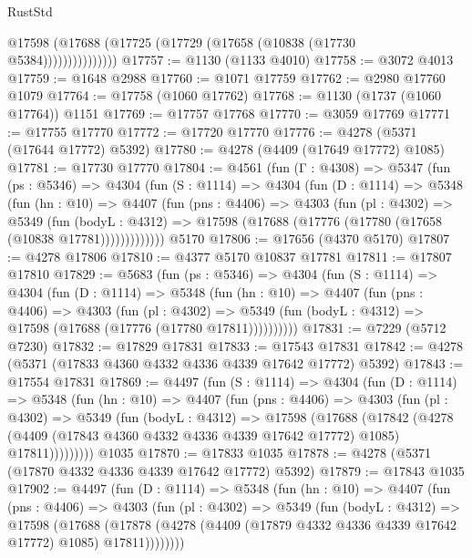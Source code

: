 \begin{lexlean}{RustStd}
\begin{coremodule}
                    @17598 (@17688 (@17725 (@17729 (@17658 (@10838 (@17730 @5384)))))))))))))))
@17757 := @1130 (@1133 @4010)
@17758 := @3072 @4013
@17759 := @1648 @2988
@17760 := @1071 @17759
@17762 := @2980 @17760 @1079
@17764 := @17758 (@1060 @17762)
@17768 := @1130 (@1737 (@1060 @17764)) @1151
@17769 := @17757 @17768
@17770 := @3059 @17769
@17771 := @17755 @17770
@17772 := @17720 @17770
@17776 := @4278 (@5371 (@17644 @17772) @5392)
@17780 := @4278 (@4409 (@17649 @17772) @1085)
@17781 := @17730 @17770
@17804 := @4561
    (fun (Γ : @4308) =>
    @5347
      (fun (ps : @5346) =>
      @4304
        (fun (S : @1114) =>
        @4304
          (fun (D : @1114) =>
          @5348
            (fun (hn : @10) =>
            @4407
              (fun (pns : @4406) =>
              @4303
                (fun (pl : @4302) =>
                @5349
                  (fun (bodyL : @4312) =>
                  @17598 (@17688 (@17776 (@17780 (@17658 (@10838 @17781)))))))))))))
    @5170
@17806 := @17656 (@4370 @5170)
@17807 := @4278 @17806
@17810 := @4377 @5170 @10837 @17781
@17811 := @17807 @17810
@17829 := @5683
    (fun (ps : @5346) =>
    @4304
      (fun (S : @1114) =>
      @4304
        (fun (D : @1114) =>
        @5348
          (fun (hn : @10) =>
          @4407
            (fun (pns : @4406) =>
            @4303
              (fun (pl : @4302) =>
              @5349 (fun (bodyL : @4312) => @17598 (@17688 (@17776 (@17780 @17811))))))))))
@17831 := @7229 (@5712 @7230)
@17832 := @17829 @17831
@17833 := @17543 @17831
@17842 := @4278 (@5371 (@17833 @4360 @4332 @4336 @4339 @17642 @17772) @5392)
@17843 := @17554 @17831
@17869 := @4497
    (fun (S : @1114) =>
    @4304
      (fun (D : @1114) =>
      @5348
        (fun (hn : @10) =>
        @4407
          (fun (pns : @4406) =>
          @4303
            (fun (pl : @4302) =>
            @5349
              (fun (bodyL : @4312) =>
              @17598
                (@17688
                  (@17842
                    (@4278
                      (@4409 (@17843 @4360 @4332 @4336 @4339 @17642 @17772) @1085)
                      @17811)))))))))
    @1035
@17870 := @17833 @1035
@17878 := @4278 (@5371 (@17870 @4332 @4336 @4339 @17642 @17772) @5392)
@17879 := @17843 @1035
@17902 := @4497
    (fun (D : @1114) =>
    @5348
      (fun (hn : @10) =>
      @4407
        (fun (pns : @4406) =>
        @4303
          (fun (pl : @4302) =>
          @5349
            (fun (bodyL : @4312) =>
            @17598
              (@17688
                (@17878 (@4278 (@4409 (@17879 @4332 @4336 @4339 @17642 @17772) @1085) @17811))))))))

\end{coremodule}
\end{lexlean}
